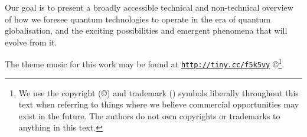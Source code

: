 Our goal is to present a broadly accessible technical and non-technical overview of how we foresee quantum technologies to operate in the era of quantum globalisation, and the exciting possibilities and emergent phenomena that will evolve from it.

The theme music for this work may be found at \texttt{\href{http://soundcloud.com/peter-rohde/wir-sind-ein-volk}{http://tiny.cc/f5k5vy}} \copyright{}\footnote{We use the copyright (\copyright) and trademark (\texttrademark) symbols liberally throughout this text when referring to things where we believe commercial opportunities may exist in the future. The authors do not own copyrights or trademarks to anything in this text.}.